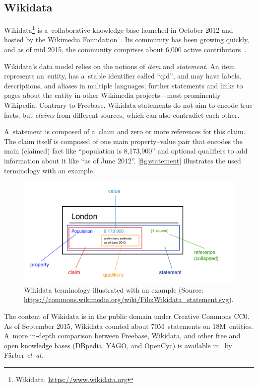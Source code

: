 \documentclass{acm_proc_article-sp}
\begin{document}
\subsection{Wikidata}

Wikidata\footnote{Wikidata: \url{https://www.wikidata.org}}
is a~collaborative knowledge base
launched in October 2012 and hosted by the Wikimedia Foundation~\cite{vrandevcic2014wikidata}.
Its community has been growing quickly, and as of mid 2015,
the community comprises about 6,000 active contributors~\cite{wikidatastats}.

Wikidata's data model relies on the notions of \emph{item} and \emph{statement}.
An item represents an~entity, has a~stable identifier called ``qid'', and may have labels,
descriptions, and aliases in multiple languages; further statements and links to pages
about the entity in other Wikimedia projects---most prominently Wikipedia.
Contrary to Freebase, Wikidata statements do not aim to encode true facts,
but \emph{claims} from different sources, which can also contradict each other.

A~statement is composed of a~claim and zero or more references for this claim.
The claim itself is composed of one main property--value pair that encodes
the main (claimed) fact like ``population is 8,173,900'' and optional qualifiers
to add information about it like ``as of June 2012''.
\autoref{fig:statement} illustrates the used terminology with an example.

\begin{figure}[!htbp]
  \centering
  \includegraphics[width=8.45 cm]{img/Wikidata_statement.pdf}
  \caption{Wikidata terminology illustrated with an example (Source:
	\url{https://commons.wikimedia.org/wiki/File:Wikidata_statement.svg}).}
  \label{fig:statement}
\end{figure}

The content of Wikidata is in the public domain under Creative Commons CC0.
As of September 2015, Wikidata counted about 70M~statements on 18M~entities.
A~more in-depth comparison between Freebase, Wikidata, and other free and open knowledge bases
(DBpedia, YAGO, and OpenCyc) is available in~\cite{farbercomparative} by Färber \emph{et~al.}
\end{document}
